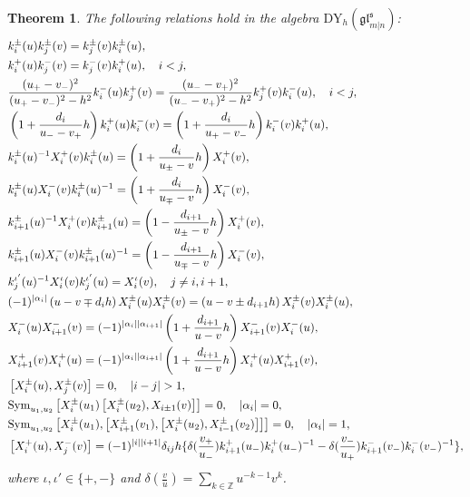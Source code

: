 \documentclass[a4paper,12pt]{article}
\newtheorem{theo}{{Theorem}}[section]
\numberwithin{equation}{section}
\begin{document}
\begin{theo}\label{Drinfeld relation 1}
The following relations hold in the algebra $\mathrm{DY}_{h}(\mathfrak{gl}^{\mathfrak{s}}_{m|n})$:
\begin{align}\label{kikj}
&k_{i}^{\pm}(u)k_{j}^{\pm}(v)=k_{j}^{\pm}(v)k_{i}^{\pm}(u),\\ \label{ki+kj-}
&k_{i}^{+}(u)k_{j}^{-}(v)=k_{j}^{-}(v)k_{i}^{+}(u),\quad i<j,\\ \label{ki-kj+}
&\frac{(u_{+}-v_{-})^{2}}{(u_{+}-v_{-})^{2}-h^{2}}k_{i}^{-}(u)k_{j}^{+}(v)=
\frac{(u_{-}-v_{+})^{2}}{(u_{-}-v_{+})^{2}-h^{2}}k_{j}^{+}(v)k_{i}^{-}(u),\quad i<j,\\ \label{ki+ki-}
&\left(1+\frac{d_{i}}{u_{-}-v_{+}}h\right)k_{i}^{+}(u)k_{i}^{-}(v)=\left(1+
\frac{d_{i}}{u_{+}-v_{-}}h\right)k_{i}^{-}(v)k_{i}^{+}(u),\\ \label{kiXi+}
&k_{i}^{\pm}(u)^{-1}X_{i}^{+}(v)k_{i}^{\pm}(u)=\left(1+\frac{d_{i}}{u_{\pm}-v}h
\right)X_{i}^{+}(v),\\ \label{kiXi-}
&k_{i}^{\pm}(u)X_{i}^{-}(v)k_{i}^{\pm}(u)^{-1}=\left(1+\frac{d_{i}}{u_{\mp}-v}h
\right)X_{i}^{-}(v),\\ \label{ki+1Xi+}
&k_{i+1}^{\pm}(u)^{-1}X_{i}^{+}(v)k_{i+1}^{\pm}(u)=\left(1-\frac{d_{i+1}}
{u_{\pm}-v}h\right)X_{i}^{+}(v),\\ \label{ki+1Xi-}
&k_{i+1}^{\pm}(u)X_{i}^{-}(v)k_{i+1}^{\pm}(u)^{-1}=\left(1-\frac{d_{i+1}}
{u_{\mp}-v}h\right)X_{i}^{-}(v),\\ \label{kjXi}
&k_{j}^{\iota'}(u)^{-1}X_{i}^{\iota}(v)k_{j}^{\iota'}(u)=X_{i}^{\iota}(v), \quad j\neq i,i+1,\\ \label{XiXi}
&(-1)^{|\alpha_{i}|}\left(u-v\mp d_{i}h\right)X_{i}^{\pm}(u)X_{i}^{\pm}(v)=\left(u-v
\pm d_{i+1}h\right)X_{i}^{\pm}(v)X_{i}^{\pm}(u),\\ \label{XiXi+1-}
&X_{i}^{-}(u)X_{i+1}^{-}(v)=(-1)^{|\alpha_{i}||\alpha_{i+1}|}\left(1+\frac{d_{i+1}}
{u-v}h\right)X_{i+1}^{-}(v)X_{i}^{-}(u),\\ \label{XiXi+1+}
&X_{i+1}^{+}(v)X_{i}^{+}(u)=(-1)^{|\alpha_{i}||\alpha_{i+1}|}\left(1+\frac{d_{i+1}}
{u-v}h\right)X_{i}^{+}(u)X_{i+1}^{+}(v),\\ \label{XiXj} 
&\left[X_{i}^{\pm}(u),X_{j}^{\pm}(v)\right]=0,\quad |i-j|>1,\\ \label{serre  i-1} 
&{\rm Sym}_{u_{1},u_{2}}\left[X_{i}^{\pm}(u_{1})\left[X_{i}^{\pm}(u_{2}),X_{i\pm 1}(v)\right]\right]=0, \quad |\alpha_{i}|=0,\\ \label{serre i-2}
&{\rm Sym}_{u_{1},u_{2}}\left[X_{i}^{\pm}(u_{1}),\left[X_{i+1}^{\pm}(v_{1}),\left[
X_{i}^{\pm}(u_{2}),X_{i-1}^{\pm}(v_{2})\right]\right]\right]=0, \quad |\alpha_{i}|=1,\\ \label{Xi+Xj-}
&\left[X_{i}^{+}(u),X_{j}^{-}(v)\right]=(-1)^{|i||i+1|}\delta_{ij}h\{\delta(\frac{v_{+}}{u_{-}})k_{i+1}^{+}(u_{-})k_{i}^{+}(u_{-})^{-1}-\delta(\frac{v_{-}}{u_{+}})k_{i+1}^{-}(v_{-})k_{i}^{-}(v_{-})^{-1}\},
\end{align}
where $\iota, \iota' \in\{+,-\}$ and $\delta(\frac{v}{u})=\sum_{k\in \mathbb{Z}}u^{-k-1}v^{k}$.
\end{theo}
\end{document}
